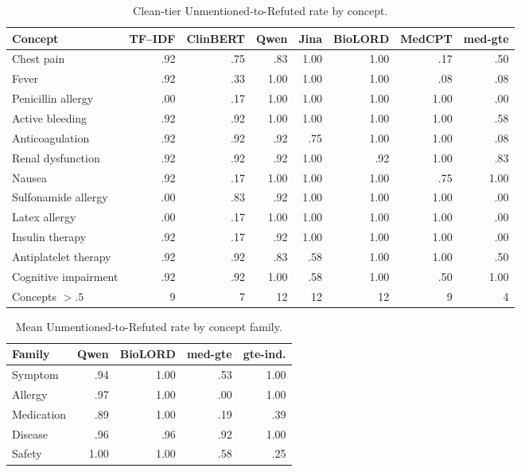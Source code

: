 \documentclass[11pt]{article}
\begin{document}
\begin{table}[t]
  \centering
  \scriptsize
  \renewcommand{\arraystretch}{1.04}
  \caption{Clean-tier Unmentioned-to-Refuted rate by concept.}
  \label{tab:concept_unr}
  \begin{tabular*}{\textwidth}{@{\extracolsep{\fill}}lrrrrrrr@{}}
    \toprule
    \textbf{Concept} & \textbf{TF--IDF} & \textbf{ClinBERT} &
    \textbf{Qwen} & \textbf{Jina} & \textbf{BioLORD} &
    \textbf{MedCPT} & \textbf{med-gte} \\
    \midrule
    Chest pain & .92 & .75 & .83 & 1.00 & 1.00 & .17 & .50 \\
    Fever & .92 & .33 & 1.00 & 1.00 & 1.00 & .08 & .08 \\
    Penicillin allergy & .00 & .17 & 1.00 & 1.00 & 1.00 & 1.00 & .00 \\
    Active bleeding & .92 & .92 & 1.00 & 1.00 & 1.00 & 1.00 & .58 \\
    Anticoagulation & .92 & .92 & .92 & .75 & 1.00 & 1.00 & .08 \\
    Renal dysfunction & .92 & .92 & .92 & 1.00 & .92 & 1.00 & .83 \\
    Nausea & .92 & .17 & 1.00 & 1.00 & 1.00 & .75 & 1.00 \\
    Sulfonamide allergy & .00 & .83 & .92 & 1.00 & 1.00 & 1.00 & .00 \\
    Latex allergy & .00 & .17 & 1.00 & 1.00 & 1.00 & 1.00 & .00 \\
    Insulin therapy & .92 & .17 & .92 & 1.00 & 1.00 & 1.00 & .00 \\
    Antiplatelet therapy & .92 & .92 & .83 & .58 & 1.00 & 1.00 & .50 \\
    Cognitive impairment & .92 & .92 & 1.00 & .58 & 1.00 & .50 & 1.00 \\
    \midrule
    Concepts $>.5$ & 9 & 7 & 12 & 12 & 12 & 9 & 4 \\
    \bottomrule
  \end{tabular*}
\end{table}

\begin{table}[!htbp]
  \centering
  \footnotesize
  \renewcommand{\arraystretch}{1.08}
  \caption{Mean Unmentioned-to-Refuted rate by concept family.}
  \label{tab:concept_group}
  \begin{tabular*}{\columnwidth}{@{\extracolsep{\fill}}lrrrr@{}}
    \toprule
    \textbf{Family} & \textbf{Qwen} & \textbf{BioLORD} &
    \textbf{med-gte} & \textbf{gte-ind.} \\
    \midrule
    Symptom    & .94 & 1.00 & .53 & 1.00 \\
    Allergy    & .97 & 1.00 & .00 & 1.00 \\
    Medication & .89 & 1.00 & .19 & .39 \\
    Disease    & .96 & .96 & .92 & 1.00 \\
    Safety     & 1.00 & 1.00 & .58 & .25 \\
    \bottomrule
  \end{tabular*}
\end{table}
\end{document}
